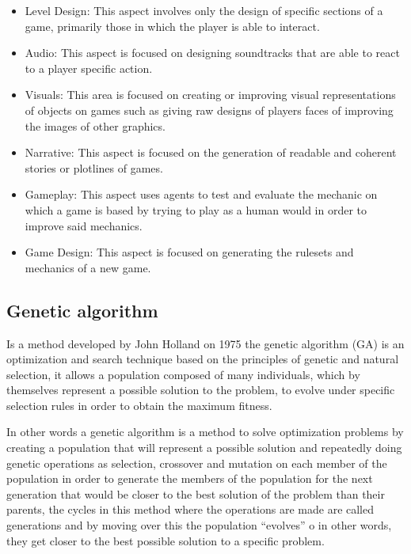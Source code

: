 \documentclass[conference]{IEEEtran}
\begin{document}
\begin{itemize}
    \item Level Design: This aspect involves only the design of specific
    sections of a game, primarily those in which the player is able to interact.
    \item Audio: This aspect is focused on designing soundtracks that are able
    to react to a player specific action.
    \item Visuals: This area is focused on creating or improving visual
    representations of objects on games such as giving raw designs of players
    faces of improving the images of other graphics.
    \item Narrative: This aspect is focused on the generation of readable and
    coherent stories or plotlines of games.
    \item Gameplay: This aspect uses agents to test and evaluate the mechanic on
    which a game is based by trying to play as a human would in order to improve
    said mechanics.
    \item Game Design: This aspect is focused on generating the rulesets and 
    mechanics of a new game. \cite{Yannakakis2017,Smith2014,shaker2016procedural}
\end{itemize}

\subsection{Genetic algorithm}
Is a method developed by John Holland on 1975 \cite{Holland1975} the genetic
algorithm (GA) is an optimization and search technique based on the principles
of genetic and natural selection, it allows a population composed of many
individuals, which by themselves represent a possible solution to the problem,
to evolve under specific selection rules in order to obtain the maximum fitness.

In other words a genetic algorithm is a method to solve optimization problems by
creating a population that will represent a possible solution and repeatedly
doing genetic operations as selection, crossover and mutation on each member of
the population in order to generate the members of the population for the next
generation that would be closer to the best solution of the problem than their
parents, the cycles in this method where the operations are made are called
generations and by moving over this the population “evolves” o in other words,
they get closer to the best possible solution  to a specific problem.
\end{document}
